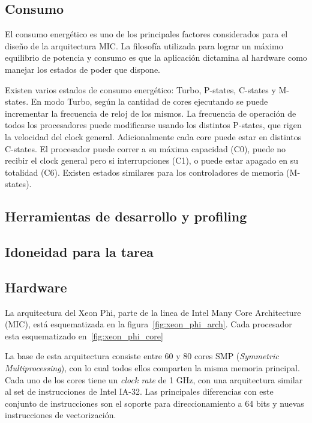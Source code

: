 \subsection{Consumo}

El consumo energ\'etico es uno de los principales factores considerados para el dise\~no de la arquitectura MIC. La filosof\'ia
utilizada para lograr un m\'aximo equilibrio de potencia y consumo es que la aplicaci\'on dictamina al hardware como 
manejar los estados de poder que dispone. 

Existen varios estados de consumo energ\'etico: Turbo, P-states, C-states y M-states. En modo Turbo, seg\'un la cantidad de
cores ejecutando se puede incrementar la frecuencia de reloj de los mismos. La frecuencia de operaci\'on de todos los procesadores
puede modificarse usando los distintos P-states, que rigen la velocidad del clock general. Adicionalmente cada core puede estar en
distintos C-states. El procesador puede correr a su m\'axima capacidad (C0), puede no recibir el clock general pero si interrupciones
(C1), o puede estar apagado en su totalidad (C6). Existen estados similares para los controladores de memoria (M-states).

\subsection{Herramientas de desarrollo y profiling}
\subsection{Idoneidad para la tarea}

\subsection{Hardware}

La arquitectura del Xeon Phi, parte de la linea de Intel Many Core Architecture (MIC), est\'a esquematizada
en la figura~\ref{fig:xeon_phi_arch}. Cada procesador esta esquematizado en~\ref{fig:xeon_phi_core}

La base de esta arquitectura consiste entre 60 y 80 cores SMP (\textit{Symmetric Multiprocessing}), con lo cual todos
ellos comparten la misma memoria principal. Cada uno de los cores tiene un \textit{clock rate} de 1 GHz,
con una arquitectura similar al set de instrucciones de Intel IA-32. Las principales diferencias con este
conjunto de instrucciones son el soporte para direccionamiento a 64 bits y nuevas instrucciones de vectorizaci\'on.


